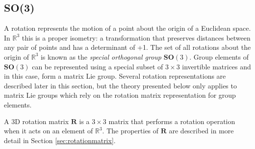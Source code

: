 		\begin{comment}	
		\textbf{Adjoint map}\\		
		EXPLANATION???\\
		For $A \in \mathbf{G}$ and $B \in ?$ define a function $\Psi$, known as the adjoint map of $\mathbf{G}$:
		\begin{equation}
			\Psi_A: \mathbf{G} \rightarrow \mathbf{G} \textnormal{, }
			\Psi_A(B) \stackrel{\Delta}{=} ABA^{-1}
		\end{equation}
		Taking the derivative:
		\begin{equation}
			\frac{\partial}{\partial t} \Psi_A(B(t))|_{t=0} = AVA^{-1} \textnormal{, }
			V \stackrel{\Delta}{=} 	\frac{\partial}{\partial t}B(t)|_{t=0}
		\end{equation}
		The adjoint	representation of $\mathbf{G}$ is given by the mapping
		\begin{equation}
			\textbf{Adj}_A: \mathfrak{g} \rightarrow \mathfrak{g} \textnormal{, }
			\textbf{Adj}_A(V) \stackrel{\Delta}{=} AVA^{-1}
		\end{equation}
		\end{comment}
		
	\subsection{\textbf{SO}(3)}	
		A rotation represents the motion of a point about the origin of a Euclidean space. In $\mathbb{R}^3$ this is a proper isometry: a transformation that preserves distances between any pair of points and has a determinant of +1. The set of all rotations about the origin of $\mathbb{R}^3$ is known as the \textit{special orthogonal group} $\textbf{SO}(3)$.
		Group elements of $\textbf{SO}(3)$ can be represented using a special subset of $3 \times 3$ invertible matrices and in this case, form a matrix Lie group. Several rotation representations are described later in this section, but the theory presented below only applies to matrix Lie groups which rely on the rotation matrix representation for group elements.
		
		A 3D rotation matrix $\mathbf{R}$ is a $3 \times 3$ matrix that performs a rotation operation when it acts on an element of $\mathbb{R}^3$. The properties of $\mathbf{R}$ are described in more detail in Section \ref{sec:rotationmatrix}.
		
